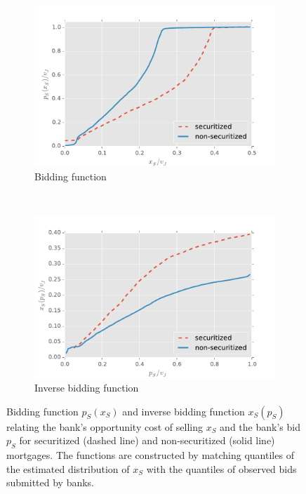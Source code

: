 \documentclass[11pt,twopage]{article}
\begin{document}
\begin{figure}
	\begin{center}
\begin{subfigure}[b]{0.5\textwidth}
		\centering
		\includegraphics[width=\textwidth]{graphics/ps_xs_semiparametric}
		\caption{Bidding function\label{fig:ps-xs-sec-nonsec}}
\end{subfigure}%
~%
\begin{subfigure}[b]{0.5\textwidth}
		\centering
		\includegraphics[width=\textwidth]{graphics/xs_ps_semiparametric}
		\caption{Inverse bidding function\label{fig:xs-ps-sec-nonsec}}
\end{subfigure}
\caption{Bidding function $p_S(x_S)$ and inverse bidding function $x_S(p_S)$ relating the bank's opportunity cost of selling $x_S$ and the bank's bid $p_S$ for securitized (dashed line) and non-securitized (solid line) mortgages. The functions are constructed by matching quantiles of the estimated distribution of $x_S$ with the quantiles of observed bids submitted by banks.}
\end{center}
\end{figure}
\end{document}
